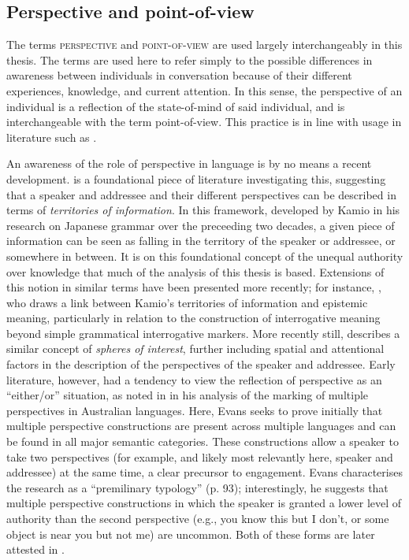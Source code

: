 \subsection{Perspective and point-of-view}\label{ss:Intro:PerspPOVDefs}
The terms \textsc{perspective} and \textsc{point-of-view} are used largely interchangeably in this thesis. The terms are used here to refer simply to the possible differences in awareness between individuals in conversation because of their different experiences, knowledge, and current attention. In this sense, the perspective of an individual is a reflection of the state-of-mind of said individual, and is interchangeable with the term point-of-view. This practice is in line with usage in literature such as . 

An awareness of the role of perspective in language is by no means a recent development.  is a foundational piece of literature investigating this, suggesting that a speaker and addressee and their different perspectives can be described in terms of \textit{territories of information}. In this framework, developed by Kamio in his research on Japanese grammar over the preceeding two decades, a given piece of information can be seen as falling in the territory of the speaker or addressee, or somewhere in between. It is on this foundational concept of the unequal authority over knowledge that much of the analysis of this thesis is based. Extensions of this notion in similar terms have been presented more recently; for instance, , who draws a link between Kamio's territories of information and epistemic meaning, particularly in relation to the construction of interrogative meaning beyond simple grammatical interrogative markers. More recently still,  describes a similar concept of \textit{spheres of interest}, further including spatial and attentional factors in the description of the perspectives of the speaker and addressee. Early literature, however, had a tendency to view the reflection of perspective as an ``either/or'' situation, as noted in  in his analysis of the marking of multiple perspectives in Australian languages. Here, Evans seeks to prove initially that multiple perspective constructions are present across multiple languages and can be found in all major semantic categories. These constructions allow a speaker to take two perspectives (for example, and likely most relevantly here, speaker and addressee) at the same time, a clear precursor to engagement. Evans characterises the research as a ``premilinary typology'' (p. 93); interestingly, he suggests that multiple perspective constructions in which the speaker is granted a lower level of authority than the second perspective (e.g., you know this but I don't, or some object is near you but not me) are uncommon. Both of these forms are later attested in . 

